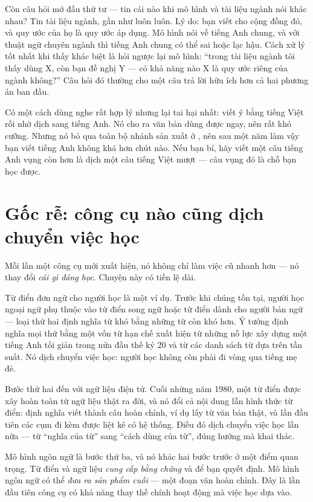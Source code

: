 \documentclass[../../english.tex]{subfiles}
\begin{document}
Còn câu hỏi mở đầu thứ tư --- tin cái nào khi mô hình và tài liệu ngành nói khác nhau? Tin tài liệu ngành, gần như luôn luôn. Lý do: bạn viết cho cộng đồng đó, và quy ước của họ là quy ước áp dụng. Mô hình nói về tiếng Anh chung, và với thuật ngữ chuyên ngành thì tiếng Anh chung có thể sai hoặc lạc hậu. Cách xử lý tốt nhất khi thấy khác biệt là hỏi ngược lại mô hình: ``trong tài liệu ngành tôi thấy dùng X, còn bạn đề nghị Y --- có khả năng nào X là quy ước riêng của ngành không?'' Câu hỏi đó thường cho một câu trả lời hữu ích hơn cả hai phương án ban đầu.

\begin{cambay}
Có một cách dùng nghe rất hợp lý nhưng lại tai hại nhất: viết ý bằng tiếng Việt rồi nhờ dịch sang tiếng Anh. Nó cho ra văn bản dùng được ngay, nên rất khó cưỡng. Nhưng nó bỏ qua toàn bộ nhánh sản xuất ở , nên sau một năm làm vậy bạn viết tiếng Anh không khá hơn chút nào. Nếu bạn bí, hãy viết một câu tiếng Anh vụng còn hơn là dịch một câu tiếng Việt mượt --- câu vụng đó là chỗ bạn học được.
\end{cambay}

\section{Gốc rễ: công cụ nào cũng dịch chuyển việc học}

Mỗi lần một công cụ mới xuất hiện, nó không chỉ làm việc cũ nhanh hơn --- nó thay đổi \emph{cái gì đáng học}. Chuyện này có tiền lệ dài.

Từ điển đơn ngữ cho người học là một ví dụ. Trước khi chúng tồn tại, người học ngoại ngữ phụ thuộc vào từ điển song ngữ hoặc từ điển dành cho người bản ngữ --- loại thứ hai định nghĩa từ khó bằng những từ còn khó hơn. Ý tưởng định nghĩa mọi thứ bằng một vốn từ hạn chế xuất hiện từ những nỗ lực xây dựng một tiếng Anh tối giản trong nửa đầu thế kỷ 20\cite{ogden1923} và từ các danh sách từ dựa trên tần suất\cite{west1953}. Nó dịch chuyển việc học: người học không còn phải đi vòng qua tiếng mẹ đẻ.

Bước thứ hai đến với ngữ liệu điện tử. Cuối những năm 1980, một từ điển được xây hoàn toàn từ ngữ liệu thật ra đời\cite{cobuild1987}, và nó đổi cả nội dung lẫn hình thức từ điển: định nghĩa viết thành câu hoàn chỉnh, ví dụ lấy từ văn bản thật, và lần đầu tiên các cụm đi kèm được liệt kê có hệ thống. Điều đó dịch chuyển việc học lần nữa --- từ ``nghĩa của từ'' sang ``cách dùng của từ'', đúng hướng mà  khai thác.

Mô hình ngôn ngữ là bước thứ ba, và nó khác hai bước trước ở một điểm quan trọng. Từ điển và ngữ liệu \emph{cung cấp bằng chứng} và để bạn quyết định. Mô hình ngôn ngữ có thể \emph{đưa ra sản phẩm cuối} --- một đoạn văn hoàn chỉnh. Đây là lần đầu tiên công cụ có khả năng thay thế chính hoạt động mà việc học dựa vào.
\end{document}
